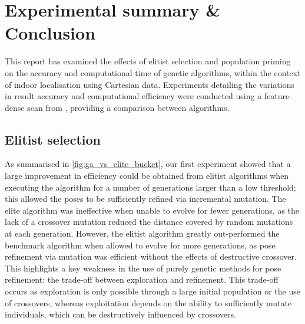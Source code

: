 \documentclass[authoryearcitations]{UoYCSproject}
\begin{document}
\chapter{Experimental summary \& Conclusion}
This report has examined the effects of elitist selection and population priming on the accuracy and computational time of genetic algorithms, within the context of indoor localisation using Cartesian data. Experiments detailing the variations in result accuracy and computational efficiency were conducted using a feature-dense scan from \citet{Lenac2011-co}, providing a comparison between algorithms.

\section{Elitist selection}
\label{sec:summary_elitist_selection}
As summarised in \autoref{fig:ga_vs_elite_bucket}, our first experiment showed that a large improvement in efficiency could be obtained from elitist algorithms when executing the algorithm for a number of generations larger than a low threshold; this allowed the poses to be sufficiently refined via incremental mutation. The elite algorithm was ineffective when unable to evolve for fewer generations, as the lack of a crossover mutation reduced the distance covered by random mutations at each generation. However, the elitist algorithm greatly out-performed the benchmark algorithm when allowed to evolve for more generations, as pose refinement via mutation was efficient without the effects of destructive crossover. This highlights a key weakness in the use of purely genetic methods for pose refinement: the trade-off between exploration and refinement. This trade-off occurs as exploration is only possible through a large initial population or the use of crossovers, whereas exploitation depends on the ability to sufficiently mutate individuals, which can be destructively influenced by crossovers.
\end{document}
